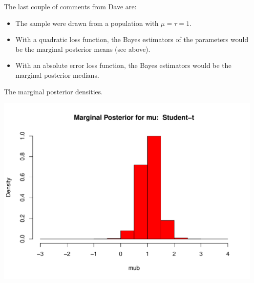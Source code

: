 \documentclass[12pt, a4paper, oneside]{article} %
\begin{document}
The last couple of comments from Dave are:
\begin{itemize}
\item The sample were drawn from a population with $\mu = \tau = 1$.  
\item With a quadratic loss function, the Bayes estimators of the parameters would be the marginal posterior means (see above). 
\item With an absolute error loss function, the Bayes estimators would be the marginal posterior medians. 
\end{itemize}
The marginal posterior densities. 

\begin{knitrout}
\color{fgcolor}\begin{kframe}
\begin{alltt}
  \hlstd{=} \hlstd{,}  \hlstd{=} \hlstd{,}  \hlstd{=} \hlstd{)}
\end{alltt}
\end{kframe}
\includegraphics[width=\maxwidth]{figure/MCMCplot1} 
\begin{kframe}\begin{alltt}
  \hlstd{=} \hlstd{,}  \hlstd{=} \hlstd{,}  \hlstd{=} \hlstd{)}
\end{alltt}
\end{kframe}

\end{knitrout}
\end{document}
